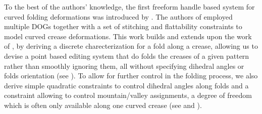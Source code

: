 To the best of the authors' knowledge, the first freeform handle based system for curved folding deformations was introduced by \cite{rabi2018shape}.  The authors of \cite{rabi2018shape} employed multiple DOGs together with a set of stitching and flattability constraints to model curved crease deformations. This work builds and extends upon the work of \cite{rabi2018shape}, by deriving a discrete charecterization for a fold along a crease, allowing us to devise a point based editing system that do folds the creases of a given pattern rather than smoothly ignoring them, all without specifying dihedral angles or folds orientation (see ). To allow for further control in the folding process, we also derive simple quadratic constraints to control dihedral angles along folds and a constraint allowing to control mountain/valley assignments, a degree of freedom which is often only available along one curved crease (see  and ).